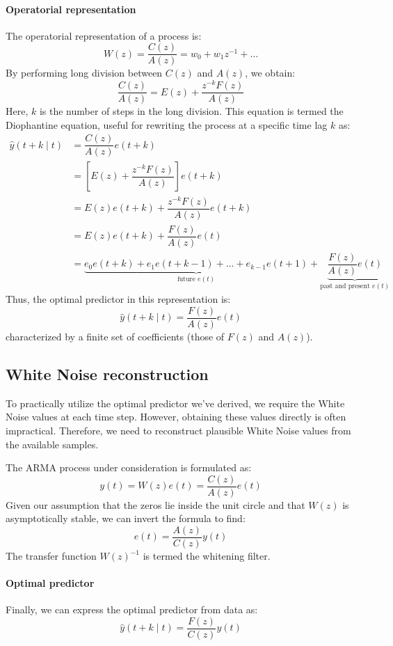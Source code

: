 \paragraph*{Operatorial representation}
The operatorial representation of a process is:
\[W(z)=\dfrac{C(z)}{A(z)}=w_0+w_1z^{-1}+\dots\]
By performing long division between $C(z)$ and $A(z)$, we obtain:
\[\dfrac{C(z)}{A(z)}=E(z)+\dfrac{z^{-k}F(z)}{A(z)}\]
Here, $k$ is the number of steps in the long division.
This equation is termed the Diophantine equation, useful for rewriting the process at a specific time lag $k$ as:
\begin{align*}
    \hat{y}(t+k\mid t)  &=\dfrac{C(z)}{A(z)}e(t+k) \\
            &=\left[E(z)+\dfrac{z^{-k}F(z)}{A(z)}\right]e(t+k) \\
            &=E(z)e(t+k)+\dfrac{z^{-k}F(z)}{A(z)}e(t+k) \\
            &=E(z)e(t+k)+\dfrac{F(z)}{A(z)}e(t) \\
            &=\underbrace{e_0e(t+k)+e_1e(t+k-1)+\dots+e_{k-1}e(t+1)}_{\text{future } e(t)} +\underbrace{\dfrac{F(z)}{A(z)}e(t)}_{\text{past and present } e(t)} 
\end{align*}
Thus, the optimal predictor in this representation is:
\[\hat{y}(t+k\mid t)=\dfrac{F(z)}{A(z)}e(t)\]
characterized by a finite set of coefficients (those of $F(z)$ and $A(z)$).

\subsection{ White Noise reconstruction}
To practically utilize the optimal predictor we've derived, we require the  White Noise values at each time step. However, obtaining these values directly is often impractical. 
Therefore, we need to reconstruct plausible  White Noise values from the available samples.

The ARMA process under consideration is formulated as:
\[y(t)=W(z)e(t)=\dfrac{C(z)}{A(z)}e(t)\]
Given our assumption that the zeros lie inside the unit circle and that $W(z)$ is asymptotically stable, we can invert the formula to find:
\[e(t)=\dfrac{A(z)}{C(z)}y(t)\]
The transfer function ${W(z)}^{-1}$ is termed the whitening filter.

\paragraph*{Optimal predictor}
Finally, we can express the optimal predictor from data as:
\[\hat{y}(t+k\mid t)=\dfrac{F(z)}{C(z)}y(t)\]

